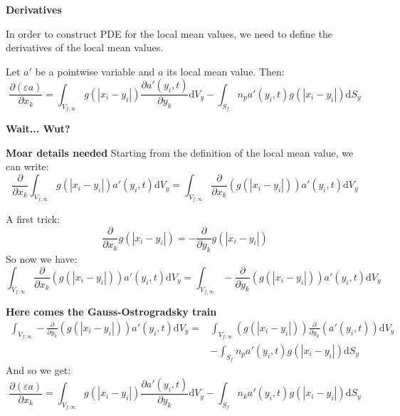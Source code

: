 \documentclass[c,11pt,xcolor=dvipsnames, aspectratio=169]{beamer}
\newcommand{\pp}[1]{\left(#1\right)}
\begin{document}
\begin{frame}{\textbf{Derivatives}}
	
	{\begin{shaded}
	In order to construct PDE for the local mean values, we need to define the derivatives of the local mean values.
	\end{shaded}}

	Let $a'$ be a pointwise variable and $a$ its local mean value. Then:
	\[
	\frac{\partial \pp{\varepsilon a}}{\partial x_k} = \int_{V_{f,\infty}} g(|x_i-y_i|) \frac{\partial a'(y_i,t)}{\partial y_k} \mathrm{d}V_y - \int_{S_f} n_p a'(y_i,t) g(|x_i-y_i|) \mathrm{d}S_y
	\]

	{
	\textbf{Wait... Wut?}
	}
\end{frame}

\begin{frame}{\textbf{Moar details needed}}
Starting from the definition of the local mean value, we can write:
\[
\frac{\partial}{\partial x_k} \int_{V_{f,\infty}} g(|x_i-y_i|) a'(y_i,t) \mathrm{d}V_y = \int_{V_{f,\infty}} \frac{\partial}{\partial x_k} \pp{g(|x_i-y_i|)} a'(y_i,t) \mathrm{d}V_y 
\]

{
	A first trick: 
	\[
	\frac{\partial }{\partial x_k} g(|x_i-y_i|) = - 	\frac{\partial }{\partial y_k} g(|x_i-y_i|)
	\]
	So now we have:
	\[
\int_{V_{f,\infty}} \frac{\partial}{\partial x_k} \pp{g(|x_i-y_i|)} a'(y_i,t) \mathrm{d}V_y  =\int_{V_{f,\infty}} -\frac{\partial} {\partial y_k} \pp{g(|x_i-y_i|)} a'(y_i,t) \mathrm{d}V_y 	
\]
}
\end{frame}
\begin{frame}{\textbf{Here comes the Gauss-Ostrogradsky train}}
\begin{align*}
\int_{V_{f,\infty}} -\frac{\partial}{\partial y_k} \pp{g(|x_i-y_i|)} a'(y_i,t) \mathrm{d}V_y 	= &\int_{V_{f,\infty}}  \pp{g(|x_i-y_i|)} \frac{\partial}{\partial y_k}\pp{a'(y_i,t)} \mathrm{d}V_y \\ &- \int_{S_f} n_p a'(y_i,t) g(|x_i-y_i|) \mathrm{d}S_y
\end{align*}
And so we get:
\[
	\frac{\partial \pp{\varepsilon a}}{\partial x_k} = \int_{V_{f,\infty}} g(|x_i-y_i|) \frac{\partial a'(y_i,t)}{\partial y_k} \mathrm{d}V_y - \int_{S_f} n_k a'(y_i,t) g(|x_i-y_i|) \mathrm{d}S_y
\]
\end{frame}
\end{document}
